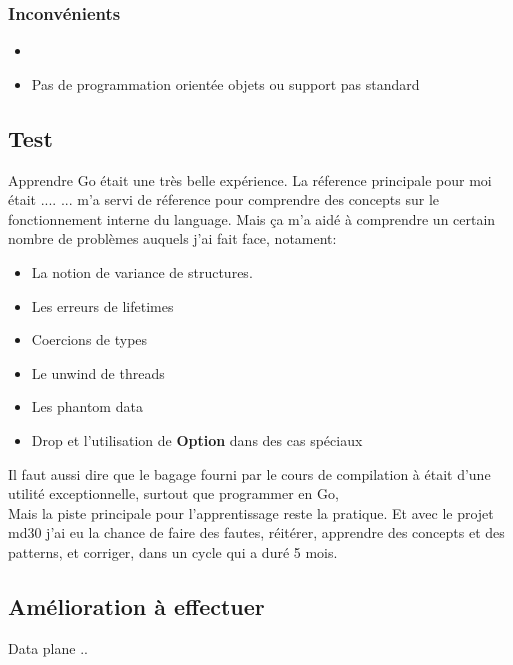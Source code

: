         \subsubsection{Inconvénients}
            \begin{itemize}
                \renewcommand{\labelitemi}{$\bullet$}
                \item 
                \item Pas de programmation orientée objets ou support pas standard
            \end{itemize}

    \subsection{Test }
        Apprendre Go était une très belle expérience. La réference principale
        pour moi était .... 
       ... m'a servi de réference pour
        comprendre des concepts sur le fonctionnement interne du language.
     Mais ça m'a aidé à
        comprendre un certain nombre de problèmes auquels j'ai fait face, notament:
        \begin{itemize}
            \renewcommand{\labelitemi}{$\bullet$}
            \item La notion de variance de structures\cite{variance_wiki}.
            \item Les erreurs de lifetimes
            \item Coercions de types
            \item Le unwind de threads
            \item Les phantom data
            \item Drop et l'utilisation de \textbf{Option} dans des cas spéciaux
        \end{itemize}
        \bigskip
        Il faut aussi dire que le bagage fourni par le cours de compilation à
        \establishment{} était d'une utilité exceptionnelle, surtout que
        programmer en Go, \\[0.3cm]
        Mais la piste principale pour l'apprentissage reste la pratique. Et avec
        le projet \gls{md30} j'ai eu la chance de faire des fautes, réitérer,
        apprendre des concepts et des patterns, et corriger, dans un cycle qui a
        duré 5 mois. 

    \subsection{Amélioration à effectuer}
        Data plane .. 
        